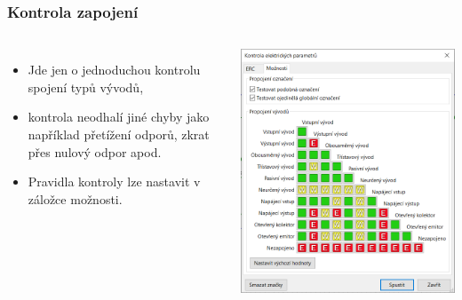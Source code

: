 \documentclass{beamer}
\begin{document}
\begin{frame}
	\frametitle{Kontrola zapojení}
	\begin{columns}
	
		\small
		\begin{itemize}
			\item Jde jen o jednoduchou kontrolu spojení typů vývodů,
			\item kontrola neodhalí jiné chyby jako například přetížení odporů, zkrat přes nulový odpor apod.
			\item Pravidla kontroly lze nastavit v záložce možnosti.
		\end{itemize}
		
		\begin{center}
			\includegraphics[width=\textwidth]{obr/kontrola06.png}
		\end{center}
		
	\end{columns}
\end{frame}


\end{document}
